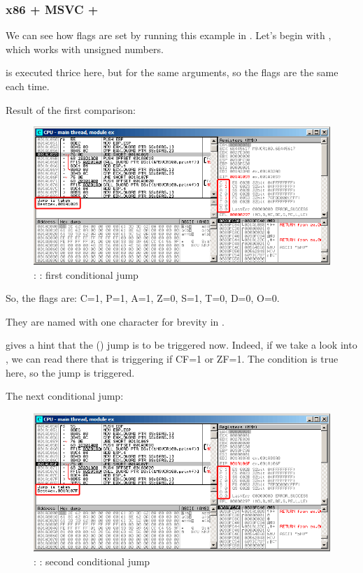 \clearpage
\subsubsection{x86 + MSVC + \olly}
\myindex{\olly}

We can see how flags are set by running this example in \olly.
Let's begin with , which works with unsigned numbers.

\CMP is executed thrice here, but for the same arguments, so the flags are the same each time.

Result of the first comparison:

\begin{figure}[H]
\centering
\includegraphics[scale=\FigScale]{patterns/07_jcc/simple/olly_unsigned1.png}
\caption{\olly: : first conditional jump}
\label{fig:jcc_olly_unsigned_1}
\end{figure}

So, the flags are: C=1, P=1, A=1, Z=0, S=1, T=0, D=0, O=0.

They are named with one character for brevity in \olly.

\olly gives a hint that the (\JBE) jump is to be triggered now.
Indeed, if we take a look into \cite{Intel}, 
we can read there that \JBE is triggering if CF=1 or ZF=1.
The condition is true here, so the jump is triggered.

\clearpage
The next conditional jump:

\begin{figure}[H]
\centering
\includegraphics[scale=\FigScale]{patterns/07_jcc/simple/olly_unsigned2.png}
\caption{\olly: : second conditional jump}
\label{fig:jcc_olly_unsigned_2}
\end{figure}

